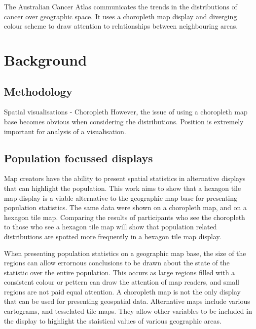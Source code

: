 \documentclass[conference,final,]{IEEEtran}
\begin{document}
The Australian Cancer Atlas communicates the trends in the distributions
of cancer over geographic space. It uses a choropleth map display and
diverging colour scheme to draw attention to relationships between
neighbouring areas.

\hypertarget{background}{%
\section{Background}\label{background}}

\hypertarget{methodology}{%
\subsection{Methodology}\label{methodology}}

Spatial visualisations - Choropleth However, the issue of using a
choropleth map base becomes obvious when considering the distributions.
Position is extremely important for analysis of a visualisation.

\hypertarget{population-focussed-displays}{%
\subsection{Population focussed
displays}\label{population-focussed-displays}}

Map creators have the ability to present spatial statistics in
alternative displays that can highlight the population. This work aims
to show that a hexagon tile map display is a viable alternative to the
geographic map base for presenting population statistics. The same data
were shown on a choropleth map, and on a hexagon tile map. Comparing the
results of participants who see the choropleth to those who see a
hexagon tile map will show that population related distributions are
spotted more frequently in a hexagon tile map display.

When presenting population statistics on a geographic map base, the size
of the regions can allow errornous conclusions to be drawn about the
state of the statistic over the entire population. This occurs as large
regions filled with a consistent colour or pettern can draw the
attention of map readers, and small regions are not paid equal
attention. A choropleth map is not the only display that can be used for
presenting geospatial data. Alternative maps include various cartograms,
and tesselated tile maps. They allow other variables to be included in
the display to highlight the staistical values of various geographic
areas.
\end{document}
